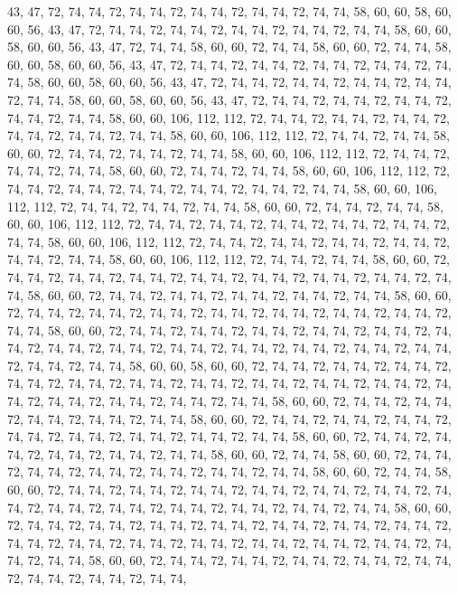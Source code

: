 43, 47, 72, 74, 74, 72, 74, 74, 72, 74, 74, 72, 74, 74, 72, 74, 74, 58, 60, 60, 58, 60, 60, 56, 43, 47, 72, 74, 74, 72, 74, 74, 72, 74, 74, 72, 74, 74, 72, 74, 74, 58, 60, 60, 58, 60, 60, 56, 43, 47, 72, 74, 74, 58, 60, 60, 72, 74, 74, 58, 60, 60, 72, 74,
74, 58, 60, 60, 58, 60, 60, 56, 43, 47, 72, 74, 74, 72, 74, 74, 72, 74, 74, 72, 74, 74, 72, 74, 74, 58, 60, 60, 58, 60, 60, 56, 43, 47, 72, 74, 74, 72, 74, 74, 72, 74, 74, 72, 74, 74, 72, 74, 74, 58, 60, 60, 58, 60, 60, 56, 43, 47, 72, 74, 74, 72, 74, 74,
72, 74, 74, 72, 74, 74, 72, 74, 74, 58, 60, 60, 106, 112, 112, 72, 74, 74, 72, 74, 74, 72, 74, 74, 72, 74, 74, 72, 74, 74, 72, 74, 74, 58, 60, 60, 106, 112, 112, 72, 74, 74, 72, 74, 74, 58, 60, 60, 72, 74, 74, 72, 74, 74, 72, 74, 74, 58, 60, 60, 106, 112, 112, 72,
74, 74, 72, 74, 74, 72, 74, 74, 58, 60, 60, 72, 74, 74, 72, 74, 74, 58, 60, 60, 106, 112, 112, 72, 74, 74, 72, 74, 74, 72, 74, 74, 72, 74, 74, 72, 74, 74, 72, 74, 74, 58, 60, 60, 106, 112, 112, 72, 74, 74, 72, 74, 74, 72, 74, 74, 58, 60, 60, 72, 74, 74, 72, 74,
74, 58, 60, 60, 106, 112, 112, 72, 74, 74, 72, 74, 74, 72, 74, 74, 72, 74, 74, 72, 74, 74, 72, 74, 74, 58, 60, 60, 106, 112, 112, 72, 74, 74, 72, 74, 74, 72, 74, 74, 72, 74, 74, 72, 74, 74, 72, 74, 74, 58, 60, 60, 106, 112, 112, 72, 74, 74, 72, 74, 74, 58, 60, 60,
72, 74, 74, 72, 74, 74, 72, 74, 74, 72, 74, 74, 72, 74, 74, 72, 74, 74, 72, 74, 74, 72, 74, 74, 58, 60, 60, 72, 74, 74, 72, 74, 74, 72, 74, 74, 72, 74, 74, 72, 74, 74, 58, 60, 60, 72, 74, 74, 72, 74, 74, 72, 74, 74, 72, 74, 74, 72, 74, 74, 72, 74, 74, 72,
74, 74, 72, 74, 74, 58, 60, 60, 72, 74, 74, 72, 74, 74, 72, 74, 74, 72, 74, 74, 72, 74, 74, 72, 74, 74, 72, 74, 74, 72, 74, 74, 72, 74, 74, 72, 74, 74, 72, 74, 74, 72, 74, 74, 72, 74, 74, 72, 74, 74, 72, 74, 74, 58, 60, 60, 58, 60, 60, 72, 74, 74, 72, 74,
74, 72, 74, 74, 72, 74, 74, 72, 74, 74, 72, 74, 74, 72, 74, 74, 72, 74, 74, 72, 74, 74, 72, 74, 74, 72, 74, 74, 72, 74, 74, 72, 74, 74, 72, 74, 74, 72, 74, 74, 58, 60, 60, 72, 74, 74, 72, 74, 74, 72, 74, 74, 72, 74, 74, 72, 74, 74, 58, 60, 60, 72, 74, 74,
72, 74, 74, 72, 74, 74, 72, 74, 74, 72, 74, 74, 72, 74, 74, 72, 74, 74, 72, 74, 74, 58, 60, 60, 72, 74, 74, 72, 74, 74, 72, 74, 74, 72, 74, 74, 72, 74, 74, 58, 60, 60, 72, 74, 74, 58, 60, 60, 72, 74, 74, 72, 74, 74, 72, 74, 74, 72, 74, 74, 72, 74, 74, 72,
74, 74, 58, 60, 60, 72, 74, 74, 58, 60, 60, 72, 74, 74, 72, 74, 74, 72, 74, 74, 72, 74, 74, 72, 74, 74, 72, 74, 74, 72, 74, 74, 72, 74, 74, 72, 74, 74, 72, 74, 74, 72, 74, 74, 72, 74, 74, 72, 74, 74, 58, 60, 60, 72, 74, 74, 72, 74, 74, 72, 74, 74, 72, 74,
74, 72, 74, 74, 72, 74, 74, 72, 74, 74, 72, 74, 74, 72, 74, 74, 72, 74, 74, 72, 74, 74, 72, 74, 74, 72, 74, 74, 72, 74, 74, 72, 74, 74, 72, 74, 74, 58, 60, 60, 72, 74, 74, 72, 74, 74, 72, 74, 74, 72, 74, 74, 72, 74, 74, 72, 74, 74, 72, 74, 74, 72, 74, 74,
